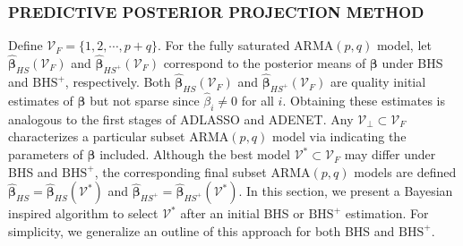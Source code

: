 \subsubsection{PREDICTIVE POSTERIOR PROJECTION METHOD}

Define $\mathcal{V}_F=\{1,2,\cdots,p+q\}$. For the fully saturated ARMA$(p,q)$ model, let $\hat{\bm{\beta}}_{HS}(\mathcal{V}_F)$ and $\hat{\bm{\beta}}_{HS^{+}}(\mathcal{V}_F)$ correspond to the posterior means of $\bm{\beta}$ under BHS and $\textrm{BHS}^+$, respectively. Both $\hat{\bm{\beta}}_{HS}(\mathcal{V}_F)$ and $\hat{\bm{\beta}}_{HS^{+}}(\mathcal{V}_F)$ are quality initial estimates of $\bm{\beta}$ but not sparse since $\hat{\beta}_i \neq 0$ for all $i$. Obtaining these estimates is analogous to the first stages of ADLASSO and ADENET. Any $\mathcal{V}_\perp \subset \mathcal{V}_F$ characterizes a particular subset ARMA$(p,q)$ model via indicating the parameters of $\bm{\beta}$ included.  Although the best model $\mathcal{V}^* \subset \mathcal{V}_F$ may differ under BHS and $\textrm{BHS}^+$, the corresponding final subset ARMA$(p,q)$ models are defined $\hat{\bm{\beta}}_{HS}=\hat{\bm{\beta}}_{HS}(\mathcal{V}^*)$ and $\hat{\bm{\beta}}_{HS^{+}}=\hat{\bm{\beta}}_{HS^{+}}(\mathcal{V}^*)$. In this section, we present a Bayesian inspired algorithm to select $\mathcal{V}^*$ after an initial BHS or $\textrm{BHS}^+$ estimation. For simplicity, we generalize an outline of this approach for both BHS and $\textrm{BHS}^+$.

